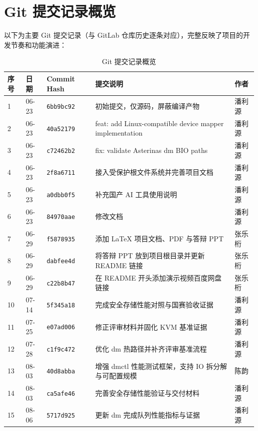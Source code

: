 \section{Git 提交记录概览}

以下为主要 Git 提交记录（与 GitLab 仓库历史逐条对应），完整反映了项目的开发节奏和功能演进：

\begin{table}[H]
    \centering
    \small
    \caption{Git 提交记录概览}
    \begin{tabular}{p{}p{}p{}p{}p{}}
        \toprule
        \textbf{序号} & \textbf{日期} & \textbf{Commit Hash} & \textbf{提交说明} & \textbf{作者} \\
        \midrule
        1 & 06-23 & \texttt{6bb9bc92} & 初始提交，仅源码，屏蔽编译产物 & 潘利源 \\
        2 & 06-23 & \texttt{40a52179} & feat: add Linux-compatible device mapper implementation & 潘利源 \\
        3 & 06-23 & \texttt{c72462b2} & fix: validate Asterinas dm BIO paths & 潘利源 \\
        4 & 06-23 & \texttt{2f8a6711} & 接入受保护根文件系统并完善项目文档 & 潘利源 \\
        5 & 06-23 & \texttt{a0dbb0f5} & 补充国产 AI 工具使用说明 & 潘利源 \\
        6 & 06-23 & \texttt{84970aae} & 修改文档 & 潘利源 \\
        7 & 06-29 & \texttt{f5878935} & 添加 LaTeX 项目文档、PDF 与答辩 PPT & 张乐桁 \\
        8 & 06-29 & \texttt{dabfee4d} & 将答辩 PPT 放到项目根目录并更新 README 链接 & 张乐桁 \\
        9 & 06-29 & \texttt{c22b8b47} & 在 README 开头添加演示视频百度网盘链接 & 张乐桁 \\
        10 & 07-14 & \texttt{5f345a18} & 完成安全存储性能对照与国赛验收证据 & 潘利源 \\
        11 & 07-25 & \texttt{e07ad006} & 修正评审材料并固化 KVM 基准证据 & 潘利源 \\
        12 & 07-28 & \texttt{c1f9c472} & 优化 dm 热路径并补齐评审基准流程 & 潘利源 \\
        13 & 08-03 & \texttt{40d8abba} & 增强 dmctl 性能测试框架，支持 IO 拆分解与可配置规模 & 陈韵 \\
        14 & 08-03 & \texttt{ca5afe46} & 完善安全存储性能验证与交付材料 & 潘利源 \\
        15 & 08-06 & \texttt{5717d925} & 更新 dm 完成队列性能指标与证据 & 潘利源 \\

\end{tabular}
\end{table}
